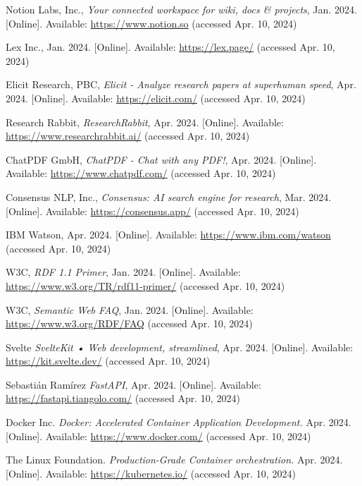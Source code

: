 \documentclass[a4paper,conference]{IEEEtran}
\begin{document}
\begin{thebibliography}{00}
 Notion Labs, Inc., \emph{Your connected workspace for wiki, docs \& projects}, Jan. 2024. [Online]. Available: \url{https://www.notion.so} (accessed Apr. 10, 2024)

Lex Inc., Jan. 2024. [Online]. Available: \url{https://lex.page/} (accessed Apr. 10, 2024)

Elicit Research, PBC, \emph{Elicit - Analyze research papers at superhuman speed}, Apr. 2024. [Online]. Available: \url{https://elicit.com/} (accessed Apr. 10, 2024)

Research Rabbit, \emph{ResearchRabbit}, Apr. 2024. [Online]. Available: \url{https://www.researchrabbit.ai/} (accessed Apr. 10, 2024)

ChatPDF GmbH, \emph{ChatPDF - Chat with any PDF!}, Apr. 2024. [Online]. Available: \url{https://www.chatpdf.com/} (accessed Apr. 10, 2024)

Consensus NLP, Inc., \emph{Consensus: AI search engine for research}, Mar. 2024. [Online]. Available: \url{https://consensus.app/} (accessed Apr. 10, 2024)

IBM Watson, Apr. 2024. [Online]. Available: \url{https://www.ibm.com/watson} (accessed Apr. 10, 2024)

W3C, \emph{RDF 1.1 Primer}, Jan. 2024. [Online]. Available: \url{https://www.w3.org/TR/rdf11-primer/} (accessed Apr. 10, 2024)

W3C, \emph{Semantic Web FAQ}, Jan. 2024. [Online]. Available: \url{https://www.w3.org/RDF/FAQ}  (accessed Apr. 10, 2024)

Svelte \emph{SvelteKit • Web development, streamlined}, Apr. 2024. [Online]. Available: \url{https://kit.svelte.dev/} (accessed Apr. 10, 2024)

Sebastián Ramírez \emph{FastAPI}, Apr. 2024. [Online]. Available: \url{https://fastapi.tiangolo.com/} (accessed Apr. 10, 2024)

Docker Inc. \emph{Docker: Accelerated Container Application Development.} Apr. 2024. [Online]. Available: \url{https://www.docker.com/} (accessed Apr. 10, 2024)

The Linux Foundation. \emph{Production-Grade Container orchestration.} Apr. 2024. [Online]. Available: \url{https://kubernetes.io/} (accessed Apr. 10, 2024)
\end{thebibliography}
\end{document}
